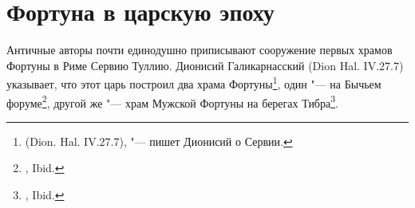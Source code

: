 \chapter{Фортуна в царскую эпоху\label{RegalRome}}






Античные авторы почти единодушно приписывают сооружение первых храмов Фортуны в Риме Сервию Туллию. Дионисий Галикарнасский (Dion Hal. IV.27.7) указывает, что этот царь построил два храма Фортуны\footnote{ (Dion. Hal. IV.27.7), "--- пишет Дионисий о Сервии.}, один "--- на Бычьем форуме\footnote{, Ibid.}, другой же "--- храм Мужской Фортуны на берегах Тибра\label{RipaTiberis}\footnote{, Ibid.}.


